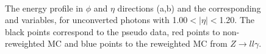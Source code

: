 \begin{figure}[ht]
    \centering
	 \\
    \caption{The energy profile in $\phi$ and $\eta$ directions (a,b) and the corresponding \Rphi and \Reta variables, for unconverted photons with 1.00$<|\eta|<$1.20. The black points correspond to the pseudo data, red points to non-reweighted MC and blue points to the reweighted MC from $Z\rightarrow ll\gamma$.}
    \label{fig:gamma:ss:reweighting:photon:3dreweighting}
\end{figure}

